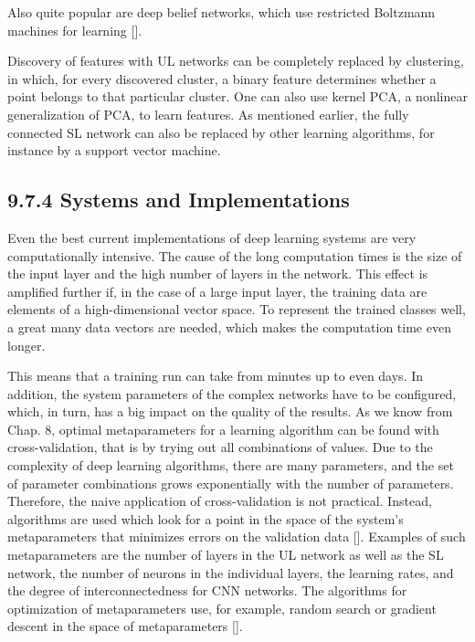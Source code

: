 \documentclass[10pt]{article}
\begin{document}
Also quite popular are deep belief networks, which use restricted Boltzmann machines for learning [\cite{hinton2006fast}].

Discovery of features with UL networks can be completely replaced by clustering, in which, for every discovered cluster, a binary feature determines whether a point belongs to that particular cluster. One can also use kernel PCA, a nonlinear generalization of PCA, to learn features. As mentioned earlier, the fully connected SL network can also be replaced by other learning algorithms, for instance by a support vector machine.

\subsection*{9.7.4 Systems and Implementations}
Even the best current implementations of deep learning systems are very computationally intensive. The cause of the long computation times is the size of the input layer and the high number of layers in the network. This effect is amplified further if, in the case of a large input layer, the training data are elements of a high-dimensional vector space. To represent the trained classes well, a great many data vectors are needed, which makes the computation time even longer.


This means that a training run can take from minutes up to even days. In addition, the system parameters of the complex networks have to be configured, which, in turn, has a big impact on the quality of the results. As we know from Chap. 8, optimal metaparameters for a learning algorithm can be found with cross-validation, that is by trying out all combinations of values. Due to the complexity of deep learning algorithms, there are many parameters, and the set of parameter combinations grows exponentially with the number of parameters. Therefore, the naive application of cross-validation is not practical. Instead, algorithms are used which look for a point in the space of the system's metaparameters that minimizes errors on the validation data [\cite{bergstra2011hyperparameter}]. Examples of such metaparameters are the number of layers in the UL network as well as the SL network, the number of neurons in the individual layers, the learning rates, and the degree of interconnectedness for CNN networks. The algorithms for optimization of metaparameters use, for example, random search or gradient descent in the space of metaparameters [\cite{maclaurin2015gradient}].
\end{document}
